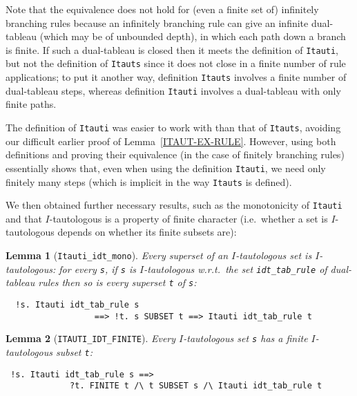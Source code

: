 \documentclass[a4paper]{article}
\newtheorem{lemma}{Lemma}
\begin{document}
Note that the equivalence does not hold for (even a finite set of)
infinitely branching rules because an infinitely branching rule can
give an infinite dual-tableau (which may be of unbounded depth),
in which each path down a branch is
finite.  If such a dual-tableau is closed then it meets the definition of
\texttt{Itauti}, but not the definition of \texttt{Itauts} since it
does not close in a finite number of rule applications; to put it
another way, definition \texttt{Itauts} involves a finite number of
dual-tableau steps, whereas definition \texttt{Itauti} 
involves a dual-tableau with only finite paths.

The definition of \texttt{Itauti} was easier to work with than that of
\texttt{Itauts}, avoiding our difficult earlier proof of 
Lemma~\ref{ITAUT-EX-RULE}.
However, using both definitions and proving their equivalence
(in the case of finitely branching rules) essentially shows that,
even when using the definition \texttt{Itauti}, we need only finitely many steps
(which is implicit in the way \texttt{Itauts} is defined).

We then obtained further necessary results, such as the monotonicity
of \texttt{Itauti} and that $I$-tautologous is a property of finite
character (i.e.\ whether a set is $I$-tautologous depends on whether its
finite subsets are):

\begin{lemma}[\texttt{Itauti\_idt\_mono}] \label{Itauti-idt-mono}
  Every superset of an $I$-tautologous set is $I$-tautologous: for every
  \texttt{s}, if \texttt{s} is $I$-tautologous w.r.t.\ the set
  \texttt{idt\_tab\_rule} of dual-tableau rules then so is every
  superset \texttt{t} of \texttt{s}:
\end{lemma}
\begin{verbatim}
  !s. Itauti idt_tab_rule s 
                  ==> !t. s SUBSET t ==> Itauti idt_tab_rule t
\end{verbatim}

\begin{lemma}[\texttt{ITAUTI\_IDT\_FINITE}]\label{ITAUTI-IDT-FINITE}
Every $I$-tautologous set \texttt{s} has
a finite $I$-tautologous subset \texttt{t}:
\end{lemma}
\begin{verbatim}
 !s. Itauti idt_tab_rule s ==>
             ?t. FINITE t /\ t SUBSET s /\ Itauti idt_tab_rule t
\end{verbatim}
\end{document}
